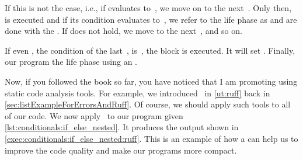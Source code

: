 If this is not the case, i.e., if  evaluates to~, we move on to the next~.
Only then,  is executed and if its condition evaluates to~, we refer to the life phase as  and are done with the .
If  does not hold, we move to the next~, and so on.

If even , the condition of the last~, is~, the  block is executed.
It will set .
Finally, our program  the life phase using an .

Now, if you followed the book so far, you have noticed that I am promoting using static code analysis tools.
For example, we introduced \ruff\ in \cref{ut:ruff} back in \cref{sec:listExampleForErrorsAndRuff}.
Of course, we should apply such tools to all of our code.
We now apply \ruff\ to our program  given \cref{lst:conditionals:if_else_nested}.
It produces the output shown in \cref{exec:conditionals:if_else_nested:ruff}.
This is an example of how a  can help us to improve the code quality and make our programs more compact.


